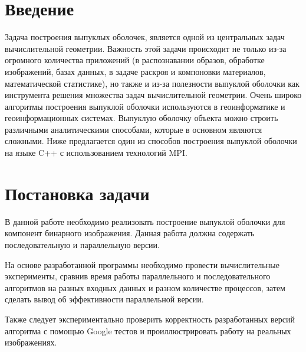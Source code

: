 \documentclass{report}
\begin{document}
\setcounter{page}{2}

\newpage

\section*{Введение}
Задача построения выпуклых оболочек, является одной из центральных задач вычислительной геометрии. Важность этой задачи происходит не только из-за огромного количества приложений (в распознавании образов, обработке изображений, базах данных, в задаче раскроя и компоновки материалов, математической статистике), но также и из-за полезности выпуклой оболочки как инструмента решения множества задач вычислительной геометрии. Очень широко алгоритмы построения выпуклой оболочки используются в геоинформатике и геоинформационных системах. Выпуклую оболочку объекта можно строить различными аналитическими способами, которые в основном являются сложными. Ниже предлагается один из способов построения выпуклой оболочки на языке C++ с использованием технологий MPI.

\newpage

\section*{Постановка задачи}
В данной работе необходимо реализовать построение выпуклой оболочки для компонент бинарного изображения. Данная работа должна содержать последовательную и параллельную версии. 
\par
На основе разработанной программы необходимо провести вычислительные эксперименты, сравнив время работы параллельного и последовательного алгоритмов на разных входных данных и разном количестве процессов, затем сделать вывод об эффективности параллельной версии.
\par
Также следует экспериментально проверить корректность разработанных версий алгоритма с помощью Google тестов и проиллюстрировать работу на реальных изображениях.
\newpage

\end{document}
